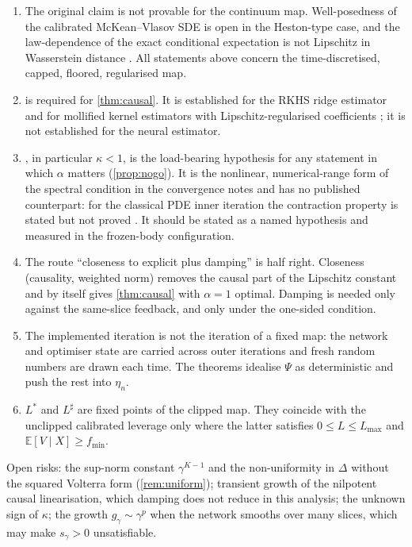 \documentclass[11pt,a4paper]{article}
\theoremstyle{plain}
\theoremstyle{definition}
\theoremstyle{definition}
\newcommand{\E}{\mathbb{E}}
\newcommand{\Lev}{L}
\newcommand{\Psimap}{\Psi}
\newcommand{\Lmax}{L_{\max}}
\newcommand{\fmin}{f_{\min}}
\begin{document}
\begin{enumerate}
\item The original claim is not provable for the continuum map. Well-posedness of the calibrated McKean--Vlasov SDE is open in the Heston-type case, and the law-dependence of the exact conditional expectation is not Lipschitz in Wasserstein distance \citep{djete2022}. All statements above concern the time-discretised, capped, floored, regularised map.
\item {} is required for \cref{thm:causal}. It is established for the RKHS ridge estimator \citep{bayer2022rkhs} and for mollified kernel estimators with Lipschitz-regularised coefficients \citep{reisinger2023}; it is not established for the neural estimator.
\item {}, in particular $\kappa < 1$, is the load-bearing hypothesis for any statement in which $\alpha$ matters (\cref{prop:nogo}). It is the nonlinear, numerical-range form of the spectral condition in the convergence notes and has no published counterpart: for the classical PDE inner iteration the contraction property is stated but not proved \citep[App.~E.3]{cozma2019}. It should be stated as a named hypothesis and measured in the frozen-body configuration.
\item The route ``closeness to explicit plus damping'' is half right. Closeness (causality, weighted norm) removes the causal part of the Lipschitz constant and by itself gives \cref{thm:causal} with $\alpha = 1$ optimal. Damping is needed only against the same-slice feedback, and only under the one-sided condition.
\item The implemented iteration is not the iteration of a fixed map: the network and optimiser state are carried across outer iterations and fresh random numbers are drawn each time. The theorems idealise $\Psimap$ as deterministic and push the rest into $\eta_n$.
\item $\Lev^*$ and $\Lev^\sharp$ are fixed points of the clipped map. They coincide with the unclipped calibrated leverage only where the latter satisfies $0 \le \Lev \le \Lmax$ and $\E[V \mid X] \ge \fmin$.
\end{enumerate}

Open risks: the sup-norm constant $\gamma^{K-1}$ and the non-uniformity in $\Delta$ without the squared Volterra form (\cref{rem:uniform}); transient growth of the nilpotent causal linearisation, which damping does not reduce in this analysis; the unknown sign of $\kappa$; the growth $g_\gamma \sim \gamma^p$ when the network smooths over many slices, which may make $s_\gamma > 0$ unsatisfiable.
\end{document}
